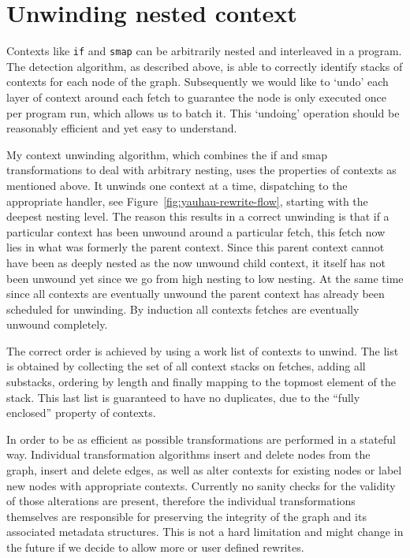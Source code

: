 \section{Unwinding nested context}

Contexts like \texttt{if} and \texttt{smap} can be arbitrarily nested and interleaved in a program.
The detection algorithm, as described above, is able to correctly identify stacks of contexts for each node of the graph.
Subsequently we would like to `undo' each layer of context around each fetch to guarantee the node is only executed once per program run, which allows us to batch it.
This `undoing' operation should be reasonably efficient and yet easy to understand.

My context unwinding algorithm, which combines the if and smap transformations to deal with arbitrary nesting, uses the properties of contexts as mentioned above.
It unwinds one context at a time, dispatching to the appropriate handler, see Figure~\ref{fig:yauhau-rewrite-flow}, starting with the deepest nesting level.
The reason this results in a correct unwinding is that if a particular context has been unwound around a particular fetch, this fetch now lies in what was formerly the parent context.
Since this parent context cannot have been as deeply nested as the now unwound child context, it itself has not been unwound yet since we go from high nesting to low nesting.
At the same time since all contexts are eventually unwound the parent context has already been scheduled for unwinding.
By induction all contexts fetches are eventually unwound completely.

The correct order is achieved by using a work list of contexts to unwind.
The list is obtained by collecting the set of all context stacks on fetches, adding all substacks, ordering by length and finally mapping to the topmost element of the stack.
This last list is guaranteed to have no duplicates, due to the ``fully enclosed'' property of contexts.

In order to be as efficient as possible transformations are performed in a stateful way.
Individual transformation algorithms insert and delete nodes from the graph, insert and delete edges, as well as alter contexts for existing nodes or label new nodes with appropriate contexts.
Currently no sanity checks for the validity of those alterations are present, therefore the individual transformations themselves are responsible for preserving the integrity of the graph and its associated metadata structures.
This is not a hard limitation and might change in the future if we decide to allow more or user defined rewrites.

